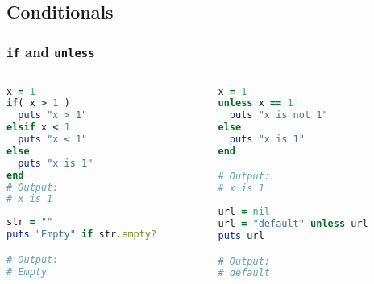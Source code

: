 \subsection{Conditionals}
\begin{frame}[fragile]\frametitle{\texttt{if} and \texttt{unless}}

\begin{columns}[c] 

\begin{column}{5.5cm}

\begin{lstlisting}[language=ruby]
x = 1
if( x > 1 ) 
  puts "x > 1"
elsif x < 1
  puts "x < 1"
else
  puts "x is 1"
end
# Output:
# x is 1
\end{lstlisting}
\pause
\begin{lstlisting}[language=ruby]
str = ""
puts "Empty" if str.empty?

# Output:
# Empty
\end{lstlisting}
\pause

\end{column}

\begin{column}{5.5cm}
\begin{lstlisting}[language=ruby]
x = 1
unless x == 1
  puts "x is not 1"
else
  puts "x is 1"
end

# Output:
# x is 1
\end{lstlisting}
\pause
\begin{lstlisting}[language=ruby]
url = nil
url = "default" unless url
puts url

# Output:
# default
\end{lstlisting}


\end{column}

\end{columns}

\end{frame}




